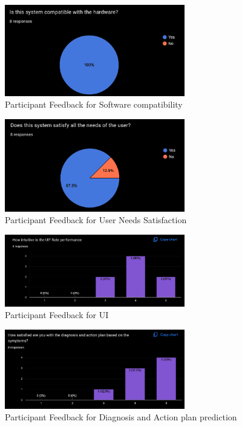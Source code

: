 \documentclass{article}
\begin{document}
\begin{figure}[h]
    \centering
    \includegraphics[width=0.7\textwidth]{Software.png}
    \caption{Participant Feedback for Software compatibility}
    \label{FigUH}
\end{figure}

\begin{figure}[h]
    \centering
    \includegraphics[width=0.7\textwidth]{UserNeeds.png}
    \caption{Participant Feedback for User Needs Satisfaction}
    \label{FigUH}
\end{figure}

\begin{figure}[h]
    \centering
    \includegraphics[width=0.7\textwidth]{UI.png}
    \caption{Participant Feedback for UI}
    \label{FigUH}
\end{figure}

\begin{figure}[h]
    \centering
    \includegraphics[width=0.7\textwidth]{DiagnosisAction.png}
    \caption{Participant Feedback for Diagnosis and Action plan prediction}
    \label{FigUH}
\end{figure}
\end{document}
